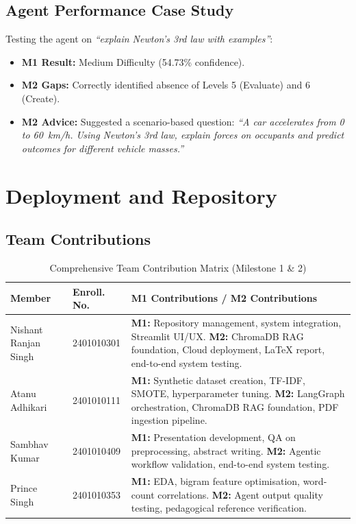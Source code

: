 \documentclass[12pt,a4paper]{article}
\begin{document}
\subsection{Agent Performance Case Study}

Testing the agent on \textit{``explain Newton's 3rd law with examples''}:
\begin{itemize}[leftmargin=2em]
  \item \textbf{M1 Result:} Medium Difficulty (54.73\% confidence).
  \item \textbf{M2 Gaps:} Correctly identified absence of Levels 5 (Evaluate) and 6 (Create).
  \item \textbf{M2 Advice:} Suggested a scenario-based question: \textit{``A car accelerates
  from 0 to 60~km/h. Using Newton's 3rd law, explain forces on occupants and predict outcomes
  for different vehicle masses.''}
\end{itemize}

\section{Deployment and Repository}

\subsection{Team Contributions}

\begin{table}[H]
\centering
\caption{Comprehensive Team Contribution Matrix (Milestone 1 \& 2)}
\label{tab:team}
\renewcommand{\arraystretch}{1.5}
\begin{tabularx}{\textwidth}{llX}
\toprule
\textbf{Member} & \textbf{Enroll. No.} & \textbf{M1 Contributions / M2 Contributions} \\
\midrule
Nishant Ranjan Singh & 2401010301 &
  \textbf{M1:} Repository management, system integration, Streamlit UI/UX.
  \textbf{M2:} ChromaDB RAG foundation, Cloud deployment, LaTeX report, end-to-end system testing. \\
Atanu Adhikari & 2401010111 &
  \textbf{M1:} Synthetic dataset creation, TF-IDF, SMOTE, hyperparameter tuning.
  \textbf{M2:} LangGraph orchestration, ChromaDB RAG foundation, PDF ingestion pipeline. \\
Sambhav Kumar & 2401010409 &
  \textbf{M1:} Presentation development, QA on preprocessing, abstract writing.
  \textbf{M2:} Agentic workflow validation, end-to-end system testing. \\
Prince Singh & 2401010353 &
  \textbf{M1:} EDA, bigram feature optimisation, word-count correlations.
  \textbf{M2:} Agent output quality testing, pedagogical reference verification. \\
\bottomrule
\end{tabularx}
\end{table}
\end{document}
